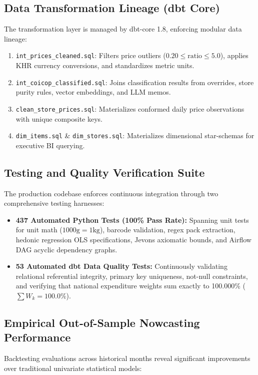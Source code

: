 \documentclass[11pt,a4paper]{article}
\begin{document}
\subsection{Data Transformation Lineage (dbt Core)}
The transformation layer is managed by dbt-core 1.8, enforcing modular data lineage:
\begin{enumerate}
    \item \texttt{int\_prices\_cleaned.sql}: Filters price outliers ($0.20 \le \text{ratio} \le 5.0$), applies KHR currency conversions, and standardizes metric units.
    \item \texttt{int\_coicop\_classified.sql}: Joins classification results from overrides, store purity rules, vector embeddings, and LLM memos.
    \item \texttt{clean\_store\_prices.sql}: Materializes conformed daily price observations with unique composite keys.
    \item \texttt{dim\_items.sql} \& \texttt{dim\_stores.sql}: Materializes dimensional star-schemas for executive BI querying.
\end{enumerate}

\subsection{Testing and Quality Verification Suite}
The production codebase enforces continuous integration through two comprehensive testing harnesses:
\begin{itemize}
    \item \textbf{437 Automated Python Tests (100\% Pass Rate):}
        Spanning unit tests for unit math ($1000\text{g} = 1\text{kg}$), barcode validation, regex pack extraction, hedonic regression OLS specifications, Jevons axiomatic bounds, and Airflow DAG acyclic dependency graphs.
    \item \textbf{53 Automated dbt Data Quality Tests:}
        Continuously validating relational referential integrity, primary key uniqueness, not-null constraints, and verifying that national expenditure weights sum exactly to 100.000\% ($\sum W_k = 100.0\%$).
\end{itemize}

\subsection{Empirical Out-of-Sample Nowcasting Performance}
Backtesting evaluations across historical months reveal significant improvements over traditional univariate statistical models:
\end{document}
